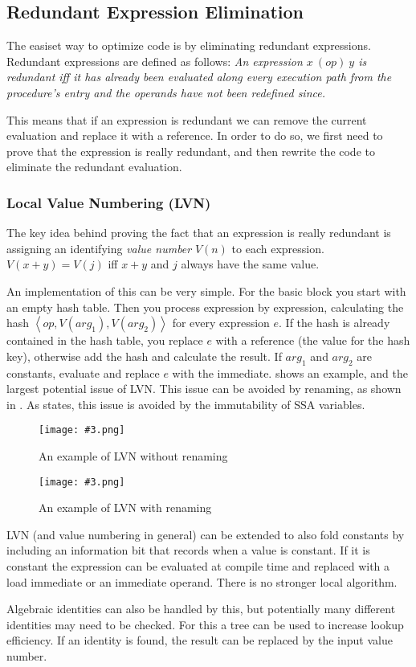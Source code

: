 \documentclass{article}
\newcommand{\fig}[4]{
	\begin{figure}[#1]
		\center
		\texttt{[image: \#3.png]}
		\caption{#4}
		\label{fig:#3}
	\end{figure}
	}
\begin{document}
\subsection{Redundant Expression Elimination}
The easiset way to optimize code is by eliminating redundant expressions.
Redundant expressions are defined as follows:
\emph{An expression $x\ (op)\ y$ is redundant iff it has already been evaluated along every execution path from the procedure's entry and the operands have not been redefined since.}

This means that if an expression is redundant we can remove the current evaluation and replace it with a reference.
In order to do so, we first need to prove that the expression is really redundant, and then rewrite the code to eliminate the redundant evaluation.

\subsubsection{Local Value Numbering (LVN)}
The key idea behind proving the fact that an expression is really redundant is assigning an identifying \emph{value number} $V(n)$ to each expression.
$V(x+y) = V(j)$ iff $x+y$ and $j$ always have the same value.

An implementation of this can be very simple.
For the basic block you start with an empty hash table.
Then you process expression by expression, calculating the hash $\left<op,V(arg_1),V(arg_2)\right>$ for every expression $e$.
If the hash is already contained in the hash table, you replace $e$ with a reference (the value for the hash key), otherwise add the hash and calculate the result.
If $arg_1$ and $arg_2$ are constants, evaluate and replace $e$ with the immediate.
 shows an example, and the largest potential issue of LVN.
This issue can be avoided by renaming, as shown in .
As  states, this issue is avoided by the immutability of SSA variables.

\fig{h}{}{lvn}{An example of LVN without renaming}
\fig{h}{}{lvn2}{An example of LVN with renaming}

LVN (and value numbering in general) can be extended to also fold constants by including an information bit that records when a value is constant.
If it is constant the expression can be evaluated at compile time and replaced with a load immediate or an immediate operand.
There is no stronger local algorithm.

Algebraic identities can also be handled by this, but potentially many different identities may need to be checked.
For this a tree can be used to increase lookup efficiency.
If an identity is found, the result can be replaced by the input value number.
\end{document}
